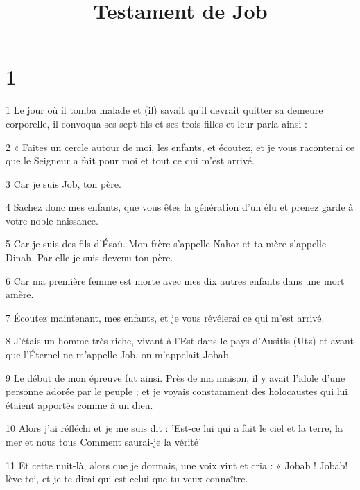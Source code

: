 


\title{Testament de Job}

\chapter{1}

\par 1 Le jour où il tomba malade et (il) savait qu'il devrait quitter sa demeure corporelle, il convoqua ses sept fils et ses trois filles et leur parla ainsi :

\par 2 « Faites un cercle autour de moi, les enfants, et écoutez, et je vous raconterai ce que le Seigneur a fait pour moi et tout ce qui m'est arrivé.

\par 3 Car je suis Job, ton père.

\par 4 Sachez donc mes enfants, que vous êtes la génération d'un élu et prenez garde à votre noble naissance.

\par 5 Car je suis des fils d'Ésaü. Mon frère s'appelle Nahor et ta mère s'appelle Dinah. Par elle je suis devenu ton père.

\par 6 Car ma première femme est morte avec mes dix autres enfants dans une mort amère.

\par 7 Écoutez maintenant, mes enfants, et je vous révélerai ce qui m'est arrivé.

\par 8 J'étais un homme très riche, vivant à l'Est dans le pays d'Ausitis (Utz) et avant que l'Éternel ne m'appelle Job, on m'appelait Jobab.

\par 9 Le début de mon épreuve fut ainsi. Près de ma maison, il y avait l'idole d'une personne adorée par le peuple ; et je voyais constamment des holocaustes qui lui étaient apportés comme à un dieu.

\par 10 Alors j'ai réfléchi et je me suis dit : 'Est-ce lui qui a fait le ciel et la terre, la mer et nous tous Comment saurai-je la vérité'

\par 11 Et cette nuit-là, alors que je dormais, une voix vint et cria : « Jobab ! Jobab! lève-toi, et je te dirai qui est celui que tu veux connaître.

